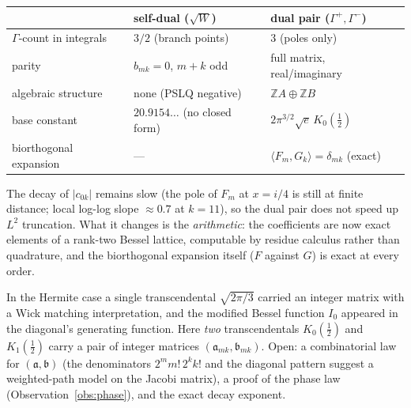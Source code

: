 \documentclass[11pt,a4paper]{article}
\theoremstyle{definition}
\theoremstyle{plain}
\newcommand{\Z}{\mathbb{Z}}
\begin{document}
\begin{center}
\small
\setlength{\tabcolsep}{4pt}
\begin{tabular}{lll}
\toprule
 & self-dual ($\sqrt{W}$) & dual pair ($\Gamma^{+}, \Gamma^{-}$) \\
\midrule
$\Gamma$-count in integrals & $3/2$ (branch points) & $3$ (poles only) \\
parity & $b_{mk} = 0$, $m+k$ odd & full matrix, real/imaginary \\
algebraic structure & none (PSLQ negative) & $\Z A \oplus \Z B$ \\
base constant & $20.9154\ldots$ (no closed form) & $2\pi^{3/2}\sqrt{e}\,K_0(\tfrac12)$ \\
biorthogonal expansion & --- & $\langle F_m, G_k\rangle = \delta_{mk}$ (exact) \\
\bottomrule
\end{tabular}
\end{center}

The decay of $|c_{0k}|$ remains slow (the pole of $F_m$ at $x = i/4$
is still at finite distance; local log-log slope $\approx 0.7$ at
$k = 11$), so the dual pair does not speed up $L^2$ truncation. What it
changes is the \emph{arithmetic}: the coefficients are now exact
elements of a rank-two Bessel lattice, computable by residue calculus
rather than quadrature, and the biorthogonal expansion itself
($F$ against $G$) is exact at every order.

\sloppy
In the Hermite case a single transcendental $\sqrt{2\pi/3}$ carried an
integer matrix with a Wick matching interpretation, and the modified
Bessel function $I_0$ appeared in the diagonal's generating function.
Here \emph{two} transcendentals $K_0(\tfrac12)$ and $K_1(\tfrac12)$
carry a pair of integer matrices
$(\mathfrak{a}_{mk}, \mathfrak{b}_{mk})$.
Open: a combinatorial law for $(\mathfrak{a}, \mathfrak{b})$ (the
denominators $2^m m!\, 2^k k!$ and the diagonal pattern suggest a
weighted-path model on the Jacobi matrix), a proof of the phase law
(Observation~\ref{obs:phase}), and the exact decay exponent.
\end{document}
